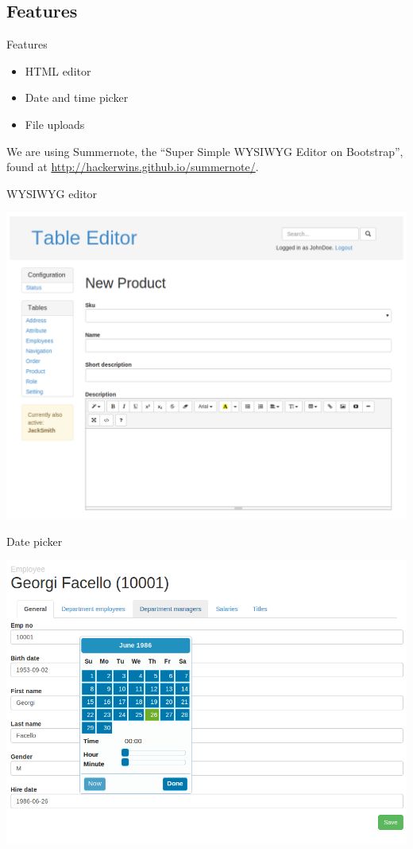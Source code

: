 \subsection{Features}
\begin{frame}{Features}
\begin{itemize}
\item HTML editor
\item Date and time picker
\item File uploads
\end{itemize}
\end{frame}

We are using Summernote, the ``Super Simple WYSIWYG Editor on Bootstrap'',
found at \url{http://hackerwins.github.io/summernote/}.

\begin{frame}[plain]{WYSIWYG editor}
  \begin{center}
    \includegraphics[width=\textwidth,height=1\textheight,keepaspectratio]{images/currently-active.png}
  \end{center}
\end{frame}

\begin{frame}[plain]{Date picker}
  \begin{center}
    \includegraphics[width=\textwidth,height=1\textheight,keepaspectratio]{images/form.png}
  \end{center}
\end{frame}

